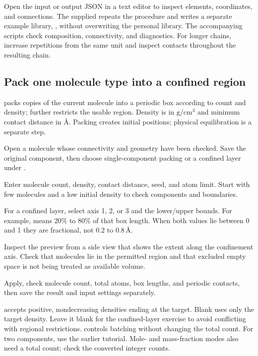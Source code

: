 Open the input or output JSON in a text editor to inspect elements, coordinates, and connections. The supplied  repeats the procedure and writes a separate example library, , without overwriting the personal library. The accompanying scripts check composition, connectivity, and diagnostics. For longer chains, increase repetitions from the same unit and inspect contacts throughout the resulting chain.

\subsection{Pack one molecule type into a confined region}\label{sec:confined-packing-reference}

 packs copies of the current molecule into a periodic box according to count and density;  further restricts the usable region. Density is in $\mathrm{g/cm^3}$ and minimum contact distance in \AA. Packing creates initial positions; physical equilibration is a separate step.

\begin{steps}
  \item Open a molecule whose connectivity and geometry have been checked. Save the original component, then choose single-component packing or a confined layer under .
  \item Enter molecule count, density, contact distance, seed, and atom limit. Start with few molecules and a low initial density to check components and boundaries.
  \item For a confined layer, select axis 1, 2, or 3 and the lower/upper bounds. For example,  means 20\% to 80\% of that box length. When both values lie between 0 and 1 they are fractional, not $0.2$ to $0.8\,\text{\AA}$.
  \item Inspect the preview from a side view that shows the extent along the confinement axis. Check that molecules lie in the permitted region and that excluded empty space is not being treated as available volume.
  \item Apply, check molecule count, total atoms, box lengths, and periodic contacts, then save the result and input settings separately.
\end{steps}

 accepts positive, nondecreasing densities ending at the target. Blank uses only the target density. Leave it blank for the confined-layer exercise to avoid conflicting with regional restrictions.  controls batching without changing the total count. For two components, use the earlier  tutorial. Mole- and mass-fraction modes also need a total count; check the converted integer counts.


